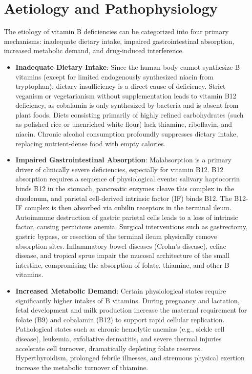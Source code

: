\section*{Aetiology and Pathophysiology}
The etiology of vitamin B deficiencies can be categorized into four primary mechanisms: inadequate dietary intake, impaired gastrointestinal absorption, increased metabolic demand, and drug-induced interference.

\begin{itemize}
    \item \textbf{Inadequate Dietary Intake}: Since the human body cannot synthesize B vitamins (except for limited endogenously synthesized niacin from tryptophan), dietary insufficiency is a direct cause of deficiency. Strict veganism or vegetarianism without supplementation leads to vitamin B12 deficiency, as cobalamin is only synthesized by bacteria and is absent from plant foods. Diets consisting primarily of highly refined carbohydrates (such as polished rice or unenriched white flour) lack thiamine, riboflavin, and niacin. Chronic alcohol consumption profoundly suppresses dietary intake, replacing nutrient-dense food with empty calories.
    \item \textbf{Impaired Gastrointestinal Absorption}: Malabsorption is a primary driver of clinically severe deficiencies, especially for vitamin B12. B12 absorption requires a sequence of physiological events: salivary haptocorrin binds B12 in the stomach, pancreatic enzymes cleave this complex in the duodenum, and parietal cell-derived intrinsic factor (IF) binds B12. The B12-IF complex is then absorbed via cubilin receptors in the terminal ileum. Autoimmune destruction of gastric parietal cells leads to a loss of intrinsic factor, causing pernicious anemia. Surgical interventions such as gastrectomy, gastric bypass, or resection of the terminal ileum physically remove absorption sites. Inflammatory bowel diseases (Crohn's disease), celiac disease, and tropical sprue impair the mucosal architecture of the small intestine, compromising the absorption of folate, thiamine, and other B vitamins.
    \item \textbf{Increased Metabolic Demand}: Certain physiological states require significantly higher intakes of B vitamins. During pregnancy and lactation, fetal development and milk production increase the maternal requirement for folate (B9) and cobalamin (B12) to support rapid cellular replication. Pathological states such as chronic hemolytic anemias (e.g., sickle cell disease), leukemia, exfoliative dermatitis, and severe thermal injuries accelerate cell turnover, dramatically depleting folate reserves. Hyperthyroidism, prolonged febrile illnesses, and strenuous physical exertion increase the metabolic turnover of thiamine.

\end{itemize}
